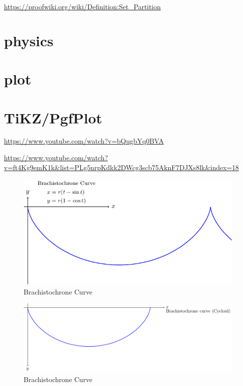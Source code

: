 \documentclass[
]{book}
\theoremstyle{definition}
\theoremstyle{definition}
\theoremstyle{definition}
\theoremstyle{definition}
\theoremstyle{remark}
\begin{document}
\url{https://proofwiki.org/wiki/Definition:Set_Partition}

\hypertarget{physics}{%
\chapter{physics}\label{physics}}

\hypertarget{plot}{%
\chapter{plot}\label{plot}}

\hypertarget{tikzpgfplot}{%
\chapter*{TiKZ/PgfPlot}\label{tikzpgfplot}}

\url{https://www.youtube.com/watch?v=bQugbYq0BVA}

\url{https://www.youtube.com/watch?v=ft4Kg9emK1k\&list=PLg5nrpKdkk2DWcg3scb75AknF7DJXs8lk\&index=18}

\begin{figure}
\includegraphics[width=0.9\linewidth]{202401260003-plot_files/figure-latex/unnamed-chunk-4-1} \caption{Brachistochrone Curve}\label{fig:unnamed-chunk-4}
\end{figure}

\begin{figure}
\includegraphics[width=0.9\linewidth]{202401260003-plot_files/figure-latex/unnamed-chunk-5-1} \caption{Brachistochrone Curve}\label{fig:unnamed-chunk-5}
\end{figure}
\end{document}
